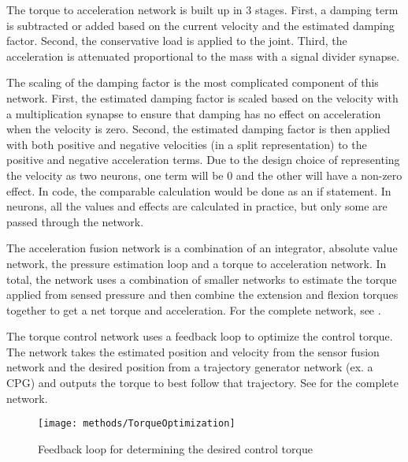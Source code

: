 The torque to acceleration network is built up in 3 stages. First, a damping 
term is subtracted or added based on the current velocity and the estimated
damping factor. Second, the conservative load is applied to the joint. Third,
the acceleration is attenuated proportional to the mass with a signal divider
synapse.

The scaling of the damping factor is the most complicated component of this
network. First, the estimated damping factor is scaled based on the velocity 
with a multiplication synapse to ensure that damping has no effect on acceleration
when the velocity is zero. Second, the estimated damping factor is then applied with both positive and
negative velocities (in a split representation) to the positive and negative
acceleration terms. Due to the design choice of representing the velocity as two
neurons, one term will be 0 and the other will have a 
non-zero effect. In code, the comparable calculation would be done as an if statement. In neurons,
all the values and effects are calculated in practice, but only some are passed
through the network.


The acceleration fusion network is a combination of an integrator, absolute
value network, the pressure estimation loop and a torque to acceleration
network. In total, the network uses a combination of smaller networks to
estimate the torque applied from sensed pressure and then combine the extension
and flexion torques together to get a net torque and acceleration. For the complete network, see .


The torque control network uses a feedback loop to optimize the
control torque. The network takes the estimated position and velocity from the 
sensor fusion network and the desired position from a trajectory generator
network (ex. a CPG) and outputs the torque to best follow that trajectory.
See  for the complete network.

\begin{figure}
\centering
\texttt{[image: methods/TorqueOptimization]}
\caption{Feedback loop for determining the desired control torque}
\label{fig:TorqueOptimizationNetwork}
\end{figure}



